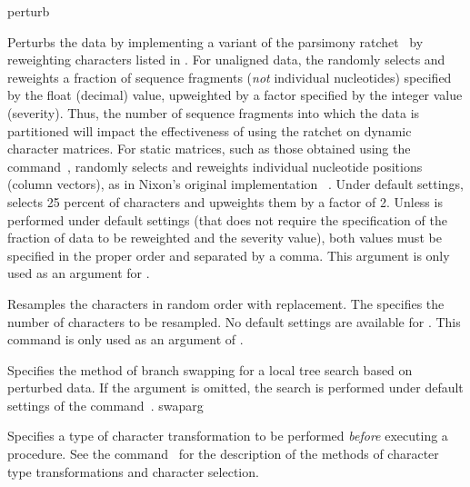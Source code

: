 \begin{command}{perturb}{}
\begin{arguments}
            {Perturbs the data by implementing a variant of the parsimony
            ratchet~\cite{Nixon1999} by reweighting characters listed in . 
            For unaligned data, the  randomly selects and reweights a fraction of
            sequence fragments (\emph{not} individual nucleotides) specified
            by the float (decimal) value, upweighted by a factor specified by the integer
            value (severity). Thus, the number of sequence fragments into which the 
            data is partitioned will impact the effectiveness of using the ratchet on dynamic character matrices.  
            For static matrices, such as those obtained using the 
            command~,  randomly selects and
            reweights individual nucleotide positions (column vectors), as in Nixon's
            original implementation ~\cite{Nixon1999}. 
            Under default settings,
             selects 25 percent of characters and upweights
            them by a factor of 2.  Unless  is performed
            under default settings (that does not require the specification of the
            fraction of data to be reweighted and the severity value), both
            values must be specified in the proper order and separated by a comma.
            This argument is only used as an argument for .}
            {}

            {Resamples the characters in random order with
            replacement. The \poyint specifies the number of characters to be resampled.
            No default settings are available for . This
            command is only used as an argument of .}
            {}

            {Specifies the method of branch swapping for a local tree search
            based on perturbed data. If the argument 
            is omitted, the search is performed under default settings of the
            command~.}
            {swaparg}

            {Specifies a type of character transformation to be performed
            \emph{before} executing a  procedure.
            See the command~ for
            the description of the methods of character type transformations
            and character selection.}
            {}


\end{arguments}
\end{command}

